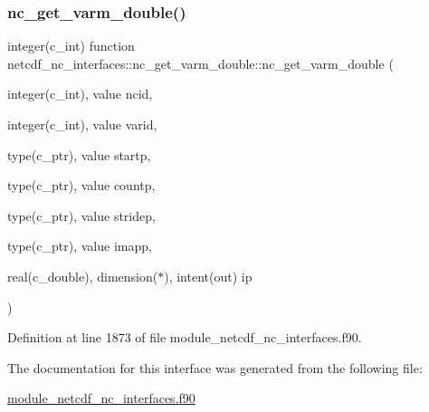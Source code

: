 \subsubsection{\texorpdfstring{nc\+\_\+get\+\_\+varm\+\_\+double()}{nc\_get\_varm\_double()}}
{\footnotesize\ttfamily integer(c\+\_\+int) function netcdf\+\_\+nc\+\_\+interfaces\+::nc\+\_\+get\+\_\+varm\+\_\+double\+::nc\+\_\+get\+\_\+varm\+\_\+double (\begin{DoxyParamCaption}\item[{integer(c\+\_\+int), value}]{ncid,  }\item[{integer(c\+\_\+int), value}]{varid,  }\item[{type(c\+\_\+ptr), value}]{startp,  }\item[{type(c\+\_\+ptr), value}]{countp,  }\item[{type(c\+\_\+ptr), value}]{stridep,  }\item[{type(c\+\_\+ptr), value}]{imapp,  }\item[{real(c\+\_\+double), dimension($\ast$), intent(out)}]{ip }\end{DoxyParamCaption})}



Definition at line 1873 of file module\+\_\+netcdf\+\_\+nc\+\_\+interfaces.\+f90.



The documentation for this interface was generated from the following file\+:\begin{DoxyCompactItemize}
\item 
\hyperlink{module__netcdf__nc__interfaces_8f90}{module\+\_\+netcdf\+\_\+nc\+\_\+interfaces.\+f90}\end{DoxyCompactItemize}
